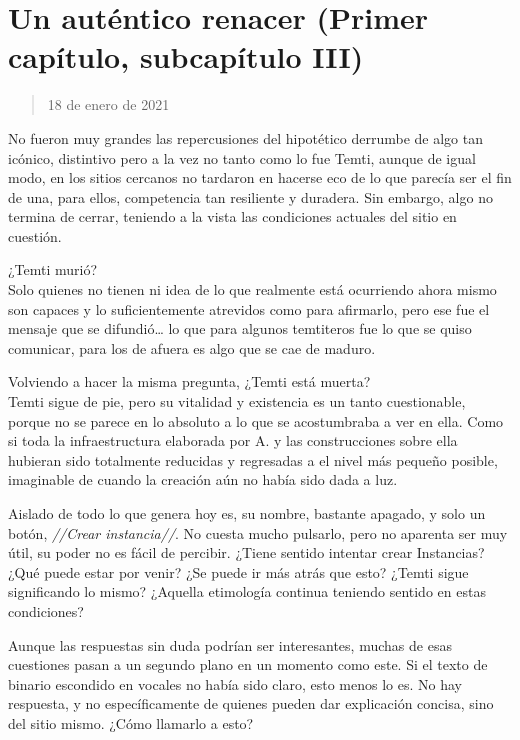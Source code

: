\documentclass[
  spanish,
]{book}
\begin{document}
\hypertarget{un-autuxe9ntico-renacer-primer-capuxedtulo-subcapuxedtulo-iii}{%
\section{Un auténtico renacer (Primer capítulo, subcapítulo III)}\label{un-autuxe9ntico-renacer-primer-capuxedtulo-subcapuxedtulo-iii}}

\begin{quote}
18 de enero de 2021
\end{quote}

No fueron muy grandes las repercusiones del hipotético derrumbe de algo tan icónico, distintivo pero a la vez no tanto como lo fue Temti, aunque de igual modo, en los sitios cercanos no tardaron en hacerse eco de lo que parecía ser el fin de una, para ellos, competencia tan resiliente y duradera. Sin embargo, algo no termina de cerrar, teniendo a la vista las condiciones actuales del sitio en cuestión.

¿Temti murió?\\
Solo quienes no tienen ni idea de lo que realmente está ocurriendo ahora mismo son capaces y lo suficientemente atrevidos como para afirmarlo, pero ese fue el mensaje que se difundió\ldots{} lo que para algunos temtiteros fue lo que se quiso comunicar, para los de afuera es algo que se cae de maduro.

Volviendo a hacer la misma pregunta, ¿Temti está muerta?\\
Temti sigue de pie, pero su vitalidad y existencia es un tanto cuestionable, porque no se parece en lo absoluto a lo que se acostumbraba a ver en ella. Como si toda la infraestructura elaborada por A. y las construcciones sobre ella hubieran sido totalmente reducidas y regresadas a el nivel más pequeño posible, imaginable de cuando la creación aún no había sido dada a luz.

Aislado de todo lo que genera hoy es, su nombre, bastante apagado, y solo un botón, \emph{//Crear instancia//}. No cuesta mucho pulsarlo, pero no aparenta ser muy útil, su poder no es fácil de percibir. ¿Tiene sentido intentar crear Instancias? ¿Qué puede estar por venir? ¿Se puede ir más atrás que esto? ¿Temti sigue significando lo mismo? ¿Aquella etimología continua teniendo sentido en estas condiciones?

Aunque las respuestas sin duda podrían ser interesantes, muchas de esas cuestiones pasan a un segundo plano en un momento como este. Si el texto de binario escondido en vocales no había sido claro, esto menos lo es. No hay respuesta, y no específicamente de quienes pueden dar explicación concisa, sino del sitio mismo. ¿Cómo llamarlo a esto?
\end{document}
